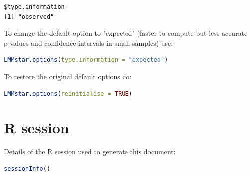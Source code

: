 \documentclass[12pt]{article}
\begin{document}
\label{}
\begin{verbatim}
$type.information
[1] "observed"
\end{verbatim}


To change the default option to "expected" (faster to compute but less accurate p-values and confidence intervals in small samples) use:
\begin{lstlisting}[language=r,numbers=none]
LMMstar.options(type.information = "expected")
\end{lstlisting}

To restore the original default options do:
\begin{lstlisting}[language=r,numbers=none]
LMMstar.options(reinitialise = TRUE)
\end{lstlisting}

\clearpage
\section{R session}
\label{sec:org4a04cc0}
Details of the R session used to generate this document:
\begin{lstlisting}[language=r,numbers=none]
sessionInfo()
\end{lstlisting}
\end{document}
